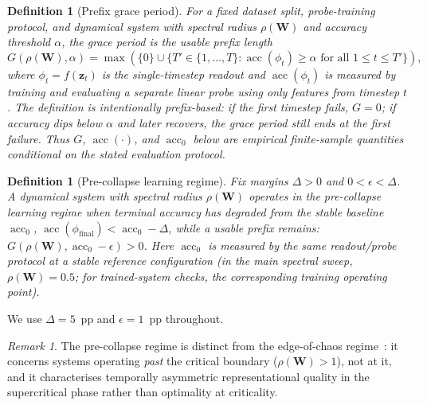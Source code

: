 \documentclass{article}
\newtheorem{definition}[theorem]{Definition}
\theoremstyle{remark}
\newtheorem{remark}[theorem]{Remark}
\newcommand{\bz}{\mathbf{z}}
\newcommand{\bW}{\mathbf{W}}
\newcommand{\sr}{\rho(\bW)}
\begin{document}
\begin{definition}[Prefix grace period]
\label{def:grace_period}
For a fixed dataset split, probe-training protocol, and dynamical system with
spectral radius $\sr$ and accuracy threshold $\alpha$, the \emph{grace period}
is the usable prefix length
\begin{equation}
    G(\sr, \alpha) =
    \max\!\left(\{0\}\cup\{T' \in \{1,\ldots,T\} :
    \operatorname{acc}(\phi_t) \geq \alpha
    \text{ for all } 1 \leq t \leq T'\}\right),
\end{equation}
where $\phi_t=f(\bz_t)$ is the single-timestep readout and
$\operatorname{acc}(\phi_t)$ is measured by training and evaluating a separate
linear probe using only features from timestep $t$. The definition is
intentionally prefix-based: if the first timestep fails, $G=0$; if accuracy
dips below $\alpha$ and later recovers, the grace period still ends at the
first failure. Thus $G$, $\operatorname{acc}(\cdot)$, and
$\operatorname{acc}_0$ below are empirical finite-sample quantities conditional
on the stated evaluation protocol.
\end{definition}

\begin{definition}[Pre-collapse learning regime]
\label{def:regime}
Fix margins $\Delta > 0$ and $0 < \epsilon < \Delta$. A dynamical system
with spectral radius $\sr$ operates in the \emph{pre-collapse learning regime}
when terminal accuracy has degraded from the stable baseline $\operatorname{acc}_0$,
$\operatorname{acc}(\phi_{\text{final}})<\operatorname{acc}_0-\Delta$, while a
usable prefix remains:
$G(\sr,\operatorname{acc}_0-\epsilon)>0$.
Here $\operatorname{acc}_0$ is measured by the same readout/probe protocol at a
stable reference configuration (in the main spectral sweep, $\rho(\bW)=0.5$;
for trained-system checks, the corresponding training operating point).
\end{definition}

We use $\Delta = 5$~pp and $\epsilon = 1$~pp throughout.

\begin{remark}
The pre-collapse regime is distinct from the edge-of-chaos
regime~\citep{bertschinger2004real}: it concerns systems operating
\emph{past} the critical boundary ($\sr > 1$), not at it, and it
characterises temporally asymmetric representational quality in the
supercritical phase rather than optimality at criticality.
\end{remark}

\end{document}
